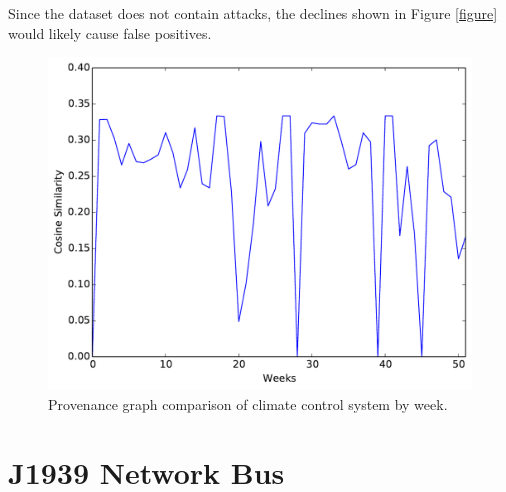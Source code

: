Since the dataset does not contain attacks, the declines shown in Figure \ref{figure} would likely cause false positives.
 




\begin{figure}[tb]
\begin{center}
\includegraphics[width=.7\columnwidth]{foo.pdf}
\end{center}
\caption{Provenance graph comparison of climate control system by week.}
\label{figure_climate}
\end{figure}

\section{J1939 Network Bus }

